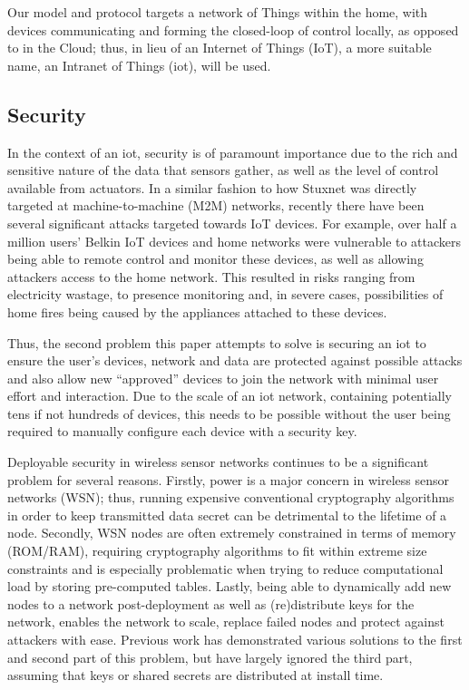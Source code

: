 \documentclass[conference]{./sty/IEEEtran}
\begin{document}
Our model and protocol targets a network of Things within the home, with devices communicating and forming the closed-loop of control locally, as opposed to in the Cloud; thus, in lieu of an Internet of Things (IoT), a more suitable name, an Intranet of Things (iot), will be used.

\subsection{Security} %
\label{sub:motivation_security}
In the context of an iot, security is of paramount importance due to the rich and sensitive nature of the data that sensors gather, as well as the level of control available from actuators. In a similar fashion to how Stuxnet was directly targeted at machine-to-machine (M2M) networks\cite{Stuxnet}, recently there have been several significant attacks targeted towards IoT devices\cite{IoTWorm,BelkinWemo}. For example, over half a million users' Belkin IoT devices and home networks were vulnerable to attackers being able to remote control and monitor these devices, as well as allowing attackers access to the home network\cite{BelkinWemo}. This resulted in risks ranging from electricity wastage, to presence monitoring and, in severe cases, possibilities of home fires being caused by the appliances attached to these devices.

Thus, the second problem this paper attempts to solve is securing an iot to ensure the user's devices, network and data are protected against possible attacks and also allow new ``approved'' devices to join the network with minimal user effort and interaction. Due to the scale of an iot network, containing potentially tens if not hundreds of devices, this needs to be possible without the user being required to manually configure each device with a security key.

Deployable security in wireless sensor networks continues to be a significant problem for several reasons. Firstly, power is a major concern in wireless sensor networks (WSN); thus, running expensive conventional cryptography algorithms in order to keep transmitted data secret can be detrimental to the lifetime of a node. Secondly, WSN nodes are often extremely constrained in terms of memory (ROM/RAM), requiring cryptography algorithms to fit within extreme size constraints and is especially problematic when trying to reduce computational load by storing pre-computed tables. Lastly, being able to dynamically add new nodes to a network post-deployment as well as (re)distribute keys for the network, enables the network to scale, replace failed nodes and protect against attackers with ease. Previous work has demonstrated various solutions to the first and second part of this problem\cite{TinySec,MiniSec,TinyECC}, but have largely ignored the third part, assuming that keys or shared secrets are distributed at install time.
\end{document}
